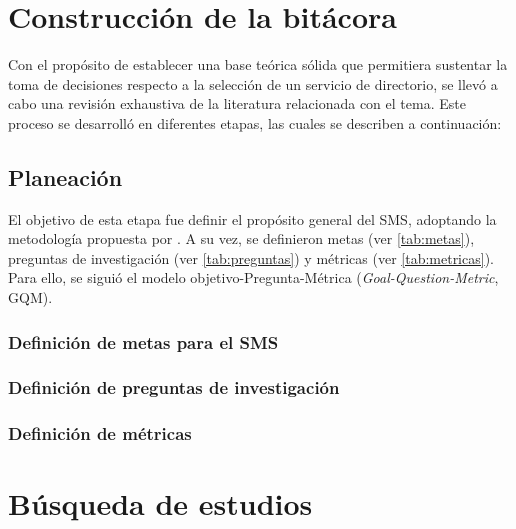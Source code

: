 \label{cap:revision-literatura}
\vspace*{0.7cm}

\section{Construcción de la bitácora}

Con el propósito de establecer una base teórica sólida que permitiera sustentar la toma de decisiones respecto a la selección de un servicio de directorio, se llevó a cabo una revisión exhaustiva de la literatura relacionada con el tema. Este proceso se desarrolló en diferentes etapas, las cuales se describen a continuación:


\subsection{Planeación}

El objetivo de esta etapa fue definir el propósito general del \ac{SMS}, adoptando la metodología propuesta por \citet{Sepulveda2021}. A su vez, se definieron metas (ver \autoref{tab:metas}), preguntas de investigación (ver \autoref{tab:preguntas}) y métricas (ver \autoref{tab:metricas}). Para ello, se siguió el modelo objetivo-Pregunta-Métrica (\textit{Goal-Question-Metric}, GQM).


\subsubsection{Definición de metas para el \ac{SMS}}



\subsubsection{Definición de preguntas de investigación}\label{subsubsec:rq-def}



\subsubsection{Definición de métricas}



\newpage
\section{Búsqueda de estudios}

